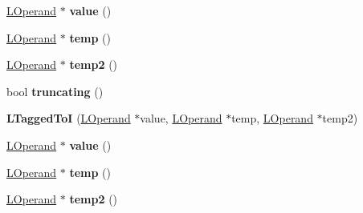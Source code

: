 \begin{DoxyCompactItemize}
\item 
\hyperlink{classv8_1_1internal_1_1_l_operand}{L\+Operand} $\ast$ {\bfseries value} ()\hypertarget{classv8_1_1internal_1_1_l_tagged_to_i_af847eb991b1b476ad690972a7266618d}{}\label{classv8_1_1internal_1_1_l_tagged_to_i_af847eb991b1b476ad690972a7266618d}

\item 
\hyperlink{classv8_1_1internal_1_1_l_operand}{L\+Operand} $\ast$ {\bfseries temp} ()\hypertarget{classv8_1_1internal_1_1_l_tagged_to_i_adc8b5fff519135913c9d0104c2fc6846}{}\label{classv8_1_1internal_1_1_l_tagged_to_i_adc8b5fff519135913c9d0104c2fc6846}

\item 
\hyperlink{classv8_1_1internal_1_1_l_operand}{L\+Operand} $\ast$ {\bfseries temp2} ()\hypertarget{classv8_1_1internal_1_1_l_tagged_to_i_a379b9f67eadcfd31650957f0d0c686a8}{}\label{classv8_1_1internal_1_1_l_tagged_to_i_a379b9f67eadcfd31650957f0d0c686a8}

\item 
bool {\bfseries truncating} ()\hypertarget{classv8_1_1internal_1_1_l_tagged_to_i_abb946d8222ed5fd6b32d2f5f99cbe24b}{}\label{classv8_1_1internal_1_1_l_tagged_to_i_abb946d8222ed5fd6b32d2f5f99cbe24b}

\item 
{\bfseries L\+Tagged\+ToI} (\hyperlink{classv8_1_1internal_1_1_l_operand}{L\+Operand} $\ast$value, \hyperlink{classv8_1_1internal_1_1_l_operand}{L\+Operand} $\ast$temp, \hyperlink{classv8_1_1internal_1_1_l_operand}{L\+Operand} $\ast$temp2)\hypertarget{classv8_1_1internal_1_1_l_tagged_to_i_afacde0d4471ca6d7246bf7ea8e226f33}{}\label{classv8_1_1internal_1_1_l_tagged_to_i_afacde0d4471ca6d7246bf7ea8e226f33}

\item 
\hyperlink{classv8_1_1internal_1_1_l_operand}{L\+Operand} $\ast$ {\bfseries value} ()\hypertarget{classv8_1_1internal_1_1_l_tagged_to_i_af847eb991b1b476ad690972a7266618d}{}\label{classv8_1_1internal_1_1_l_tagged_to_i_af847eb991b1b476ad690972a7266618d}

\item 
\hyperlink{classv8_1_1internal_1_1_l_operand}{L\+Operand} $\ast$ {\bfseries temp} ()\hypertarget{classv8_1_1internal_1_1_l_tagged_to_i_adc8b5fff519135913c9d0104c2fc6846}{}\label{classv8_1_1internal_1_1_l_tagged_to_i_adc8b5fff519135913c9d0104c2fc6846}

\item 
\hyperlink{classv8_1_1internal_1_1_l_operand}{L\+Operand} $\ast$ {\bfseries temp2} ()\hypertarget{classv8_1_1internal_1_1_l_tagged_to_i_a379b9f67eadcfd31650957f0d0c686a8}{}\label{classv8_1_1internal_1_1_l_tagged_to_i_a379b9f67eadcfd31650957f0d0c686a8}


\end{DoxyCompactItemize}
